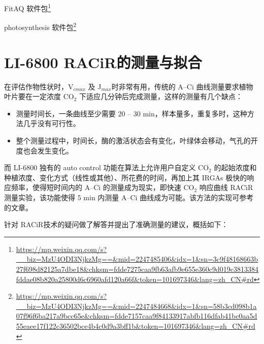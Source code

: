 \documentclass[
]{krantz}
\providecommand{\tightlist}{%
  \setlength{\itemsep}{0pt}\setlength{\parskip}{0pt}}
\renewcommand{\href}[2]{#2\footnote{\url{#1}}}
\begin{document}
\href{https://mp.weixin.qq.com/s?__biz=MzU4ODI3NjkzMg==\&mid=2247485406\&idx=1\&sn=3c9f48168663b27f698d82125a7dbe18\&chksm=fdde7275caa9fb63afb9e655e360c9d019c3813384fddae08b820a25800d6c6960afd120a66f\&token=101697346\&lang=zh_CN\#rd}{FitAQ 软件包}

\href{https://mp.weixin.qq.com/s?__biz=MzU4ODI3NjkzMg==\&mid=2247484668\&idx=1\&sn=58b3cd098b1a07f96f6ba217a9bcc65e\&chksm=fdde7157caa9f84133917abfb116dfab41bc0aa5d55eaee17f122c36502bce4b4c0d9a3bff1b\&token=101697346\&lang=zh_CN\#rd}{photosynthesis 软件包}

\cleardoublepage

\hypertarget{racir68}{%
\section{\texorpdfstring{LI-6800 RACiR\texttrademark 的测量与拟合}{LI-6800 RACiR的测量与拟合}}\label{racir68}}

在评估作物性状时，V\(_{cmax}\) 及 J\(_{max}\)时非常有用，传统的 A--Ci 曲线测量要求植物叶片要在一定浓度 CO\(_{2}\)
下适应几分钟后完成测量，这样的测量有几个缺点：

\begin{itemize}
\tightlist
\item
  测量时间长，一条曲线至少需要 20 -- 30 min，样本量多，重复多时，这种方法几乎没有可行性。
\item
  整个测量过程中，时间长，酶的激活状态会有变化，叶绿体会移动，气孔的开度也会发生变化。
\end{itemize}

而 LI-6800 独有的 auto control 功能在算法上允许用户自定义 CO\(_{2}\) 的起始浓度和种植浓度、变化方式（线性或其他）、所花费的时间，再加上其
IRGAs 极快的响应频率，使得短时间内的 A--Ci 的测量成为现实，即快速 CO\(_{2}\) 响应曲线 RACiR\texttrademark
测量实验，该功能使得 5 min 内测量 A--Ci 曲线成为可能。该方法的实现可参考 \citet{stinziano2017}
的文章。

\citet{stinziano2018} 针对 RACiR\texttrademark 技术的疑问做了解答并提出了准确测量的建议，概括如下：
\end{document}
